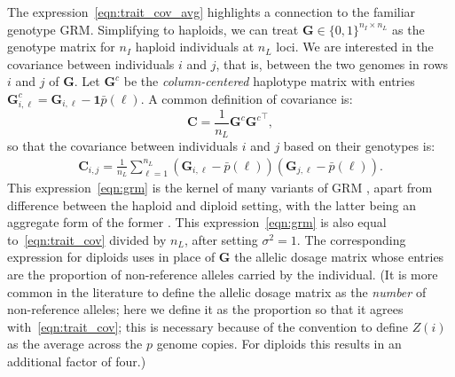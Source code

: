 The expression~\eqref{eqn:trait_cov_avg}
highlights a connection to the familiar genotype GRM.
%
Simplifying to haploids, we can treat
$\mathbf{G} \in \{0, 1\}^{n_I \times n_L}$ as the genotype matrix
for $n_I$ haploid individuals at $n_L$ loci.
%
We are interested in the covariance between individuals $i$ and $j$,
that is, between the two genomes in rows $i$ and $j$ of $\mathbf{G}$.
%
Let $\mathbf{G}^c$ be the \textit{column-centered} haplotype matrix with
entries $\mathbf{G}^c_{i,\ell} = \mathbf{G}_{i,\ell} - \mathbf{1}\bar{p}(\ell)$.
%
A common definition of covariance is:
% 
\[ \mathbf{C} = \frac{1}{n_L}\mathbf{G}^c{\mathbf{G}^c}^\intercal, \]
%
so that the covariance between individuals $i$ and $j$ based on their genotypes is:
%
\begin{align} \label{eqn:grm}
    \mathbf{C}_{i,j} = \frac{1}{n_L} \sum_{\ell=1}^{n_L} (\mathbf{G}_{i,\ell} - \bar{p}(\ell))(\mathbf{G}_{j,\ell} - \bar{p}(\ell)).
\end{align}
%
This expression~\eqref{eqn:grm} is the kernel of many variants of GRM
\citep{vanraden2008efficient, yang2010common, speed2015relatedness},
apart from difference between the haploid and diploid setting,
with the latter being an aggregate form of the former
\citep{cockerham1976group, smith1985efficient}.
%
This expression~\eqref{eqn:grm} is also equal to~\eqref{eqn:trait_cov}
divided by $n_L$, after setting $\sigma^2=1$.
%
The corresponding expression for diploids uses
in place of $\mathbf{G}$ the allelic dosage matrix
whose entries are the proportion of non-reference alleles carried by the individual.
(It is more common in the literature to define the allelic dosage matrix
as the \emph{number} of non-reference alleles;
here we define it as the proportion so that it agrees with~\eqref{eqn:trait_cov};
this is necessary because 
of the convention to define $Z(i)$ as the average across the $p$ genome copies.
For diploids this results in an additional factor of four.)



